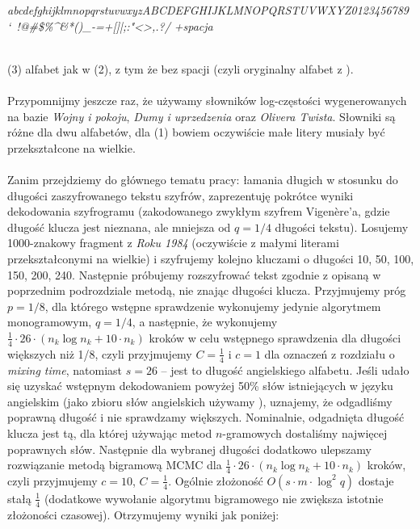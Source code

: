\documentclass[a4paper]{article}
\theoremstyle{defn}
\theoremstyle{theorem}
\theoremstyle{lemma}
\theoremstyle{cor}
\theoremstyle{fact}
\begin{document}
\begin{center}
\textit{abcdefghijklmnopqrstuvwxyzABCDEFGHIJKLMNOPQRSTUVWXYZ0123456789\\
`~!@#\$\%\^&*()\_-=+{}[]|;:"<>,.?/ +spacja }\\\\
\end{center}
(3) alfabet jak w (2), z tym że bez spacji (czyli oryginalny alfabet z \cite{alphaqwerty}). \\\\
Przypomnijmy jeszcze raz, że używamy słowników log-częstości wygenerowanych na bazie \textit{Wojny i pokoju}, \textit{Dumy i uprzedzenia} oraz \textit{Olivera Twista}. Słowniki są różne dla dwu alfabetów, dla (1) bowiem oczywiście małe litery musiały być przekształcone na wielkie.\\\\
Zanim przejdziemy do głównego tematu pracy: łamania długich w stosunku do długości zaszyfrowanego tekstu szyfrów, zaprezentuję pokrótce wyniki dekodowania szyfrogramu (zakodowanego zwykłym szyfrem Vigenère'a, gdzie długość klucza jest nieznana, ale mniejsza od $q=1/4$ długości tekstu). Losujemy 1000-znakowy fragment z \textit{Roku 1984} (oczywiście z małymi literami przekształconymi na wielkie) i szyfrujemy kolejno kluczami o długości 10, 50, 100, 150, 200, 240. Następnie próbujemy rozszyfrować tekst zgodnie z opisaną w poprzednim podrozdziale metodą, nie znając długości klucza. Przyjmujemy próg $p=1/8$, dla którego wstępne sprawdzenie wykonujemy jedynie algorytmem monogramowym, $q=1/4$, a następnie, że wykonujemy $\frac{1}{4} \cdot 26\cdot (n_k \log n_k + 10\cdot n_k)$ kroków w celu wstępnego sprawdzenia dla długości większych niż 1/8, czyli przyjmujemy $C=\frac{1}{4}$ i $c=1$ dla oznaczeń z rozdziału o \textit{mixing time}, natomiast $s=26$ – jest to długość angielskiego alfabetu. Jeśli udało się uzyskać wstępnym dekodowaniem powyżej 50\% słów istniejących w języku angielskim (jako zbioru słów angielskich używamy \cite{scrabble}), uznajemy, że odgadliśmy poprawną długość i nie sprawdzamy większych. Nominalnie, odgadnięta długość klucza jest tą, dla której używając metod $n$-gramowych dostaliśmy najwięcej poprawnych słów. Następnie dla wybranej długości dodatkowo ulepszamy rozwiązanie metodą bigramową MCMC dla $\frac{1}{4} \cdot 26\cdot (n_k \log n_k + 10\cdot n_k)$ kroków, czyli przyjmujemy $c=10$, $C=\frac{1}{4}$. Ogólnie złożoność $O(s \cdot m \cdot \log^2 q)$ dostaje stałą $\frac{1}{4}$ (dodatkowe wywołanie algorytmu bigramowego nie zwiększa istotnie złożoności czasowej).  Otrzymujemy wyniki jak poniżej:
\end{document}
